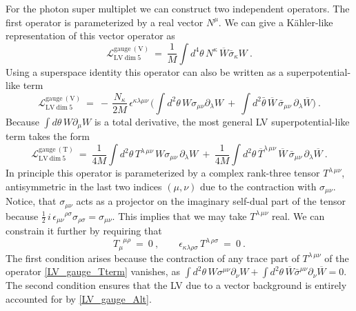\documentclass[12pt]{revtex4}
\begin{document}
For the photon super multiplet we can construct two independent
operators. The first operator is parameterized by a real vector
$N^\mu$. We can give a K\"ahler-like representation of this vector
operator as  
\begin{equation}
\label{LV_gauge}
\mathcal{L}_{\mathrm{LV\ dim\ 5}}^{\mathrm{gauge\ (V)}} ~=~ 
\frac 1M \int d^4\theta \, 
N^\kappa\, \overline{W} \bar{\sigma}_\kappa W~.   
\end{equation}
%
Using a superspace identity this operator can also be written as a
superpotential-like term  
%
\begin{equation}
\label{LV_gauge_Alt}
\mathcal{L}_{\mathrm{LV\ dim\ 5}}^{\mathrm{gauge\ (V)}} ~=~ 
- \, \frac {N_\kappa}{2 M}\,  \epsilon^{\kappa\lambda\mu\nu} \,  
\Big( 
\int d^2\theta\, W \sigma_{\mu\nu} \partial_\lambda W ~+~
\int d^2\bar{\theta}\, \overline{W} \, \bar{\sigma}_{\mu\nu}\, 
\partial_\lambda \overline{W} 
\Big)~.
\end{equation} 
%
Because $\int d\theta\, W\partial_\mu W$ is a total derivative, 
the most general LV superpotential-like term takes the form 
\begin{equation}
\label{LV_gauge_Tterm}
\mathcal{L}_{\mathrm{LV\ dim\ 5}}^{\mathrm{gauge\ (T)}} ~=~ 
\frac 1{4M} 
\int d^2\theta \, T^{\lambda\, \mu\nu} \,
        W \sigma_{\mu\nu} \, \partial_\lambda W  
~+~ \frac 1{4M} 
\int d^2\theta \, \overline{T}^{\lambda\, \mu\nu} \,
        \overline{W} \,\bar{\sigma}_{\mu\nu}\, \partial_\lambda\overline{W}  
~.
\end{equation}
%
In principle this operator is parameterized by a complex rank-three
tensor $T^{\lambda\,\mu\nu}$, antisymmetric in the last two indices
$(\mu,\nu)$ due to the contraction with $\sigma_{\mu\nu}$. Notice, that
$\sigma_{\mu\nu}$ acts as a projector on the imaginary self-dual part
of the tensor because 
\(
\frac{1}{2}\,i\,\epsilon_{\mu\nu}{}^{\rho\sigma}
\sigma_{\rho\sigma} = \sigma_{\mu\nu}. 
\)
This implies that we may take $T^{\lambda\,\mu\nu}$ real. We can
constrain it further by requiring that 
%
\begin{equation}
T_\mu^{\phantom{\mu}\mu\rho} ~=~ 0~,
 \qquad 
\epsilon_{\kappa\lambda\rho\sigma}\, T^{\lambda\,\rho\sigma}  ~=~  0~.
\end{equation} 
%
The first condition arises because the contraction of any trace part of
$T^{\lambda\,\mu\nu}$ of the operator \eqref{LV_gauge_Tterm} vanishes, as
\(
\int d^2\theta \, W\sigma^{\mu\nu} \partial_\nu W + 
\int d^2\theta \, \overline{W} \bar\sigma^{\mu\nu} \partial_\nu
\overline{W} = 0. 
\)
The second condition ensures that the LV due to a vector 
background is entirely accounted for by \eqref{LV_gauge_Alt}.
\end{document}
